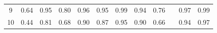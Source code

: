 \documentclass[twoside,11pt]{article}
\begin{document}
\begin{table}[H]
{\begin{tabular}{ccccccccclcc}
\multicolumn{1}{|c|}{9}                                                                           & \multicolumn{1}{c|}{0.64}                                                           & \multicolumn{1}{c|}{0.95}                                                                      & \multicolumn{1}{c|}{0.80}                                                                & \multicolumn{1}{c|}{\cellcolor[HTML]{ECF4FF}0.96}                                        & \multicolumn{1}{c|}{0.95}                                                                & \multicolumn{1}{c|}{\cellcolor[HTML]{FFCCC9}0.99}                                           & \multicolumn{1}{c|}{0.94}                                                                   & \multicolumn{1}{c|}{0.76}                                                                   & \multicolumn{1}{l|}{}                    & \multicolumn{1}{c|}{0.97}                                                                      & \multicolumn{1}{c|}{0.99}                                                                      \\ \cline{1-1}
\multicolumn{1}{|c|}{10}                                                                          & \multicolumn{1}{c|}{0.44}                                                           & \multicolumn{1}{c|}{0.81}                                                                      & \multicolumn{1}{c|}{0.68}                                                                & \multicolumn{1}{c|}{\cellcolor[HTML]{ECF4FF}0.90}                                        & \multicolumn{1}{c|}{0.87}                                                                & \multicolumn{1}{c|}{\cellcolor[HTML]{FFCCC9}0.95}                                           & \multicolumn{1}{c|}{\cellcolor[HTML]{ECF4FF}0.90}                                           & \multicolumn{1}{c|}{0.66}                                                                   & \multicolumn{1}{l|}{}                    & \multicolumn{1}{c|}{0.94}                                                                      & \multicolumn{1}{c|}{0.97}                                                                      \\ \cline{1-1}

\end{tabular}}
\end{table}
\end{document}
